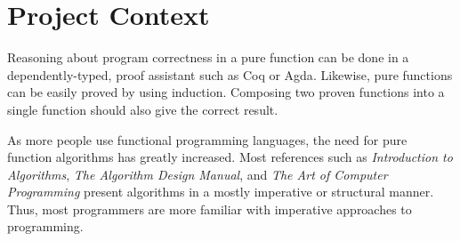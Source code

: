 






\section{Project Context}

Reasoning about program correctness in a pure function can be done 
in a dependently-typed, proof assistant such as Coq or 
Agda\cite{Breitner2018}\cite{SpectorZabusky2018}\cite{ElBakouny2017}. 
Likewise, pure functions can be easily proved by using 
induction. Composing two proven functions into a single 
function should also give the correct result\cite{AbelBenkeBove2005}.

As more people use functional programming languages, 
the need for pure function algorithms has greatly increased. 
Most references such as \emph{Introduction to Algorithms},
\emph{The Algorithm Design Manual}, and \emph{The Art of Computer Programming} 
present algorithms in a mostly imperative or structural manner.\cite{CLRS}\cite{Skiena}\cite{Knuth1997} 
Thus, most programmers are more familiar with imperative 
approaches to programming.


